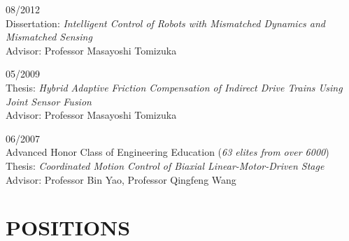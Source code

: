 \documentclass[UTF8,nofonts]{res}
\begin{document}
\begin{resume}
       \hfill 08/2012\\
    Dissertation: {\it Intelligent Control of Robots with Mismatched Dynamics and Mismatched Sensing}\\
    Advisor: Professor Masayoshi Tomizuka

       \hfill 05/2009\\
    Thesis: {\it Hybrid Adaptive Friction Compensation of Indirect Drive Trains Using Joint Sensor Fusion}\\
    Advisor: Professor Masayoshi Tomizuka

       \hfill 06/2007\\
     \hfill Advanced Honor Class of Engineering Education (\emph{63 elites from over 6000})\\
    Thesis: {\it Coordinated Motion Control of Biaxial Linear-Motor-Driven Stage}\\
    Advisor: Professor Bin Yao, Professor Qingfeng Wang


\section{POSITIONS}
\vspace{0.1in}
\begin{list}{}{\setlength\leftmargin{0in}\setlength\topsep{0.15in}}


\end{list}
\end{resume}
\end{document}
